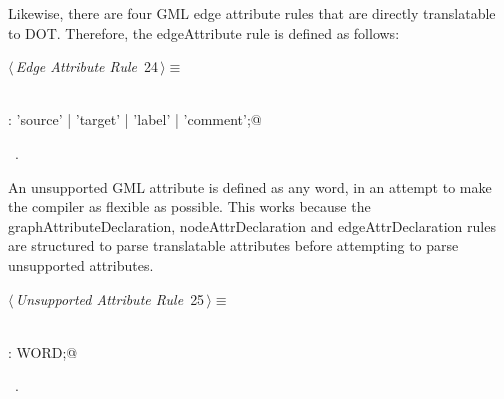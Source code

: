 \documentclass[a4paper]{report}
\begin{document}
Likewise, there are four GML edge attribute rules that are directly translatable to DOT. Therefore, the edgeAttribute rule is defined as follows:
\begin{flushleft} \small
\begin{minipage}{\linewidth}\label{scrap24}\raggedright\small
{} $\langle\,${\itshape Edge Attribute Rule}\nobreak\ {\footnotesize {24}}$\,\rangle\equiv$
\vspace{-1ex}
\begin{list}{}{} \item
\mbox{}\verb@@\\
\mbox{}\verb@edgeAttribute: 'source' | 'target' | 'label' | 'comment';@\\
\mbox{}\verb@@{\NWsep}
\end{list}
\vspace{-1.5ex}
\footnotesize
\begin{list}{}{\setlength{\itemsep}{-\parsep}\setlength{\itemindent}{-\leftmargin}}
\item \NWtxtMacroRefIn\ .

\item{}
\end{list}
\end{minipage}\vspace{4ex}
\end{flushleft}
An unsupported GML attribute is defined as any word, in an attempt to make the compiler as flexible as possible. This works because the
graphAttributeDeclaration, nodeAttrDeclaration and edgeAttrDeclaration rules are structured to parse translatable attributes before attempting to parse
unsupported attributes.
\begin{flushleft} \small
\begin{minipage}{\linewidth}\label{scrap25}\raggedright\small
{} $\langle\,${\itshape Unsupported Attribute Rule}\nobreak\ {\footnotesize {25}}$\,\rangle\equiv$
\vspace{-1ex}
\begin{list}{}{} \item
\mbox{}\verb@@\\
\mbox{}\verb@unsupportedAttribute:  WORD;@\\
\mbox{}\verb@@{\NWsep}
\end{list}
\vspace{-1.5ex}
\footnotesize
\begin{list}{}{\setlength{\itemsep}{-\parsep}\setlength{\itemindent}{-\leftmargin}}
\item \NWtxtMacroRefIn\ .

\item{}
\end{list}
\end{minipage}\vspace{4ex}
\end{flushleft}
\end{document}
